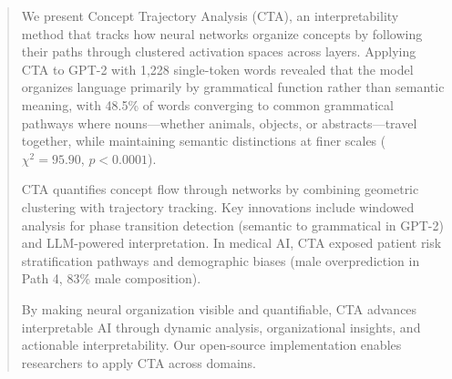 \begin{abstract}
We present Concept Trajectory Analysis (CTA), an interpretability method that tracks how neural networks organize concepts by following their paths through clustered activation spaces across layers. Applying CTA to GPT-2 with 1,228 single-token words revealed that the model organizes language primarily by grammatical function rather than semantic meaning, with 48.5\% of words converging to common grammatical pathways where nouns---whether animals, objects, or abstracts---travel together, while maintaining semantic distinctions at finer scales ($\chi^2 = 95.90$, $p < 0.0001$).

CTA quantifies concept flow through networks by combining geometric clustering with trajectory tracking. Key innovations include windowed analysis for phase transition detection (semantic to grammatical in GPT-2) and LLM-powered interpretation. In medical AI, CTA exposed patient risk stratification pathways and demographic biases (male overprediction in Path 4, 83\% male composition).

By making neural organization visible and quantifiable, CTA advances interpretable AI through dynamic analysis, organizational insights, and actionable interpretability. Our open-source implementation enables researchers to apply CTA across domains.
\end{abstract}